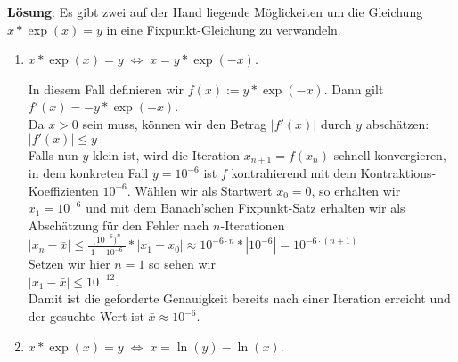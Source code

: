 \documentclass{article}
\newcommand{\bruch}[2]{\displaystyle\frac{\;\displaystyle#1\;}{\;\displaystyle#2\;}}
\begin{document}
\noindent
\textbf{L\"osung}:
Es gibt  zwei auf der Hand liegende M\"oglickeiten um die Gleichung $x*\exp(x) = y$ in eine
Fixpunkt-Gleichung zu verwandeln.  
\begin{enumerate}
\item $x*\exp(x) = y \;\Leftrightarrow\; x = y*\exp(-x)$.

      In diesem Fall definieren wir $f(x) := y*\exp(-x)$. Dann gilt
      \\[0.1cm]
      \hspace*{1.3cm} $f'(x) = -y*\exp(-x)$.
      \\[0.1cm]
      Da $x>0$ sein muss, k\"onnen wir den Betrag $|f'(x)|$ durch $y$ absch\"atzen: 
      \\[0.1cm]
      \hspace*{1.3cm}
      $|f'(x)| \leq y$
      \\[0.1cm]
      Falls nun $y$ klein ist, wird die Iteration $x_{n+1}=f(x_n)$ schnell konvergieren,
      in dem konkreten Fall $y=10^{-6}$ ist $f$ kontrahierend mit dem
      Kontraktions-Koeffizienten $10^{-6}$.  W\"ahlen wir als Startwert $x_0 = 0$,
      so erhalten wir $x_1 = 10^{-6}$ und mit dem Banach'schen Fixpunkt-Satz erhalten wir
      als Absch\"atzung f\"ur den Fehler nach $n$-Iterationen 
      \\[0.1cm]
      \hspace*{1.3cm}
      $|x_n - \bar{x}| \leq \bruch{\bigl(10^{-6}\bigr)^n}{1-10^{-6}}*|x_1-x_0| \approx
      10^{-6\cdot n} *|10^{-6}| = 10^{-6\cdot (n+1)}$ 
      \\[0.1cm]
      Setzen wir hier $n=1$ so sehen wir 
      \\[0.1cm]
      \hspace*{1.3cm}
      $|x_1 - \bar{x}| \leq  10^{-12}$.
      \\[0.1cm]
      Damit ist die geforderte Genauigkeit bereits nach einer Iteration erreicht
      und der gesuchte Wert ist $\bar{x} \approx 10^{-6}$.
\item $x*\exp(x) = y \;\Leftrightarrow\;  x = \ln(y) - \ln(x)$.


\end{enumerate}
\end{document}
